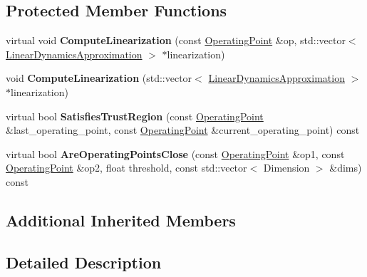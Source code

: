 \subsection*{Protected Member Functions}
\begin{DoxyCompactItemize}
\item 
virtual void {\bfseries Compute\+Linearization} (const \hyperlink{structilqgames_1_1_operating_point}{Operating\+Point} \&op, std\+::vector$<$ \hyperlink{structilqgames_1_1_linear_dynamics_approximation}{Linear\+Dynamics\+Approximation} $>$ $\ast$linearization)\hypertarget{classilqgames_1_1_i_l_q_flat_solver_ac4b65b77cdc282df8092668fc4215795}{}\label{classilqgames_1_1_i_l_q_flat_solver_ac4b65b77cdc282df8092668fc4215795}

\item 
void {\bfseries Compute\+Linearization} (std\+::vector$<$ \hyperlink{structilqgames_1_1_linear_dynamics_approximation}{Linear\+Dynamics\+Approximation} $>$ $\ast$linearization)\hypertarget{classilqgames_1_1_i_l_q_flat_solver_a62a5f589fa336023dada5826b006b473}{}\label{classilqgames_1_1_i_l_q_flat_solver_a62a5f589fa336023dada5826b006b473}

\item 
virtual bool {\bfseries Satisfies\+Trust\+Region} (const \hyperlink{structilqgames_1_1_operating_point}{Operating\+Point} \&last\+\_\+operating\+\_\+point, const \hyperlink{structilqgames_1_1_operating_point}{Operating\+Point} \&current\+\_\+operating\+\_\+point) const \hypertarget{classilqgames_1_1_i_l_q_flat_solver_a0f9a32d7bb55ff8d44c6a34ecc2335ee}{}\label{classilqgames_1_1_i_l_q_flat_solver_a0f9a32d7bb55ff8d44c6a34ecc2335ee}

\item 
virtual bool {\bfseries Are\+Operating\+Points\+Close} (const \hyperlink{structilqgames_1_1_operating_point}{Operating\+Point} \&op1, const \hyperlink{structilqgames_1_1_operating_point}{Operating\+Point} \&op2, float threshold, const std\+::vector$<$ Dimension $>$ \&dims) const \hypertarget{classilqgames_1_1_i_l_q_flat_solver_a4b79c70958d7ac9eb19c8b95de8dc33a}{}\label{classilqgames_1_1_i_l_q_flat_solver_a4b79c70958d7ac9eb19c8b95de8dc33a}

\end{DoxyCompactItemize}
\subsection*{Additional Inherited Members}


\subsection{Detailed Description}


